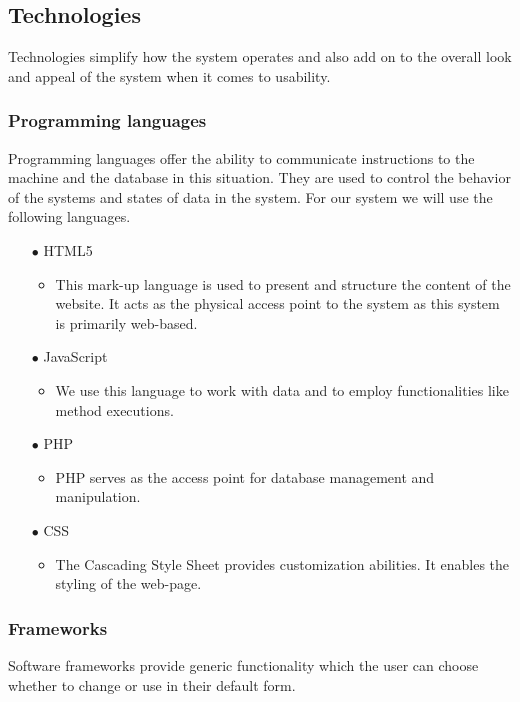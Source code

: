 \documentclass[a4paper,12pt]{article}
\begin{document}
\subsection{Technologies}
\begin{flushleft}
	Technologies simplify how the system operates and also add on to the overall look and appeal of the system when it comes to usability.
	
	\subsubsection{Programming languages}
	Programming languages offer the ability to communicate instructions to the machine and the database in this situation. They are used to control the behavior of the systems and states of data in the system. For our system we will use the following languages.
	
	\begin{itemize}
		\item[$\bullet$] HTML5
		\begin{itemize}
		\item This mark-up language is used to present and structure the content of the website. It acts as the physical access point to the system as this system is primarily web-based.
		\end{itemize}
		
		\item[$\bullet$] JavaScript
		\begin{itemize}
		\item We use this language to work with data and to employ functionalities like method executions.
		\end{itemize}
		
		\item[$\bullet$] PHP
		\begin{itemize}
		\item PHP serves as the access point for database management and manipulation.
		\end{itemize}
		
		\item[$\bullet$] CSS
		\begin{itemize}
		\item The Cascading Style Sheet provides customization abilities. It enables the styling of the web-page.
		\end{itemize}
		
	\end{itemize}
	
	\subsubsection{Frameworks}
	Software frameworks provide generic functionality which the user can choose whether to change or use in their default form.
	

\end{flushleft}
\end{document}
